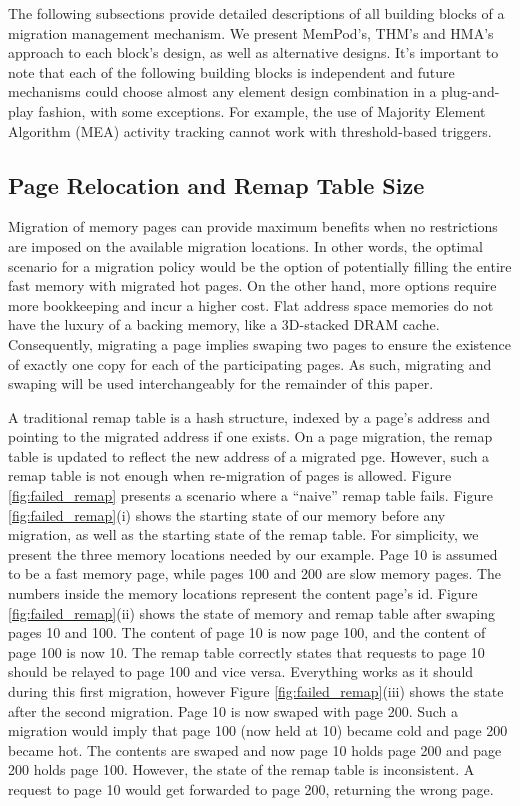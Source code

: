 The following subsections provide detailed descriptions of all building blocks of a migration management mechanism. We present MemPod's, THM's and HMA's approach to each block's design, as well as alternative designs. It's important to note that each of the following building blocks is independent and future mechanisms could choose almost any element design combination in a plug-and-play fashion, with some exceptions. For example, the use of Majority Element Algorithm (MEA) activity tracking cannot work with threshold-based triggers.

\subsection{Page Relocation and Remap Table Size}
\label{sec:relocation}

Migration of memory pages can provide maximum benefits when no restrictions are imposed on the available migration locations. In other words, the optimal scenario for a migration policy would be the option of potentially filling the entire fast memory with migrated hot pages. On the other hand, more options require more bookkeeping and incur a higher cost. Flat address space memories do not have the luxury of a backing memory, like a 3D-stacked DRAM cache. Consequently, migrating a page implies swaping two pages to ensure the existence of exactly one copy for each of the participating pages. As such, migrating and swaping will be used interchangeably for the remainder of this paper.

A traditional remap table is a hash structure, indexed by a page's address and pointing to the migrated address if one exists. On a page migration, the remap table is updated to reflect the new address of a migrated pge. However, such a remap table is not enough when re-migration of pages is allowed. Figure \ref{fig:failed_remap} presents a scenario where a ``naive'' remap table fails. Figure \ref{fig:failed_remap}(i) shows the starting state of our memory before any migration, as well as the starting state of the remap table. For simplicity, we present the three memory locations needed by our example. Page 10 is assumed to be a fast memory page, while pages 100 and 200 are slow memory pages. The numbers inside the memory locations represent the content page's id. Figure \ref{fig:failed_remap}(ii) shows the state of memory and remap table after swaping pages 10 and 100. The content of page 10 is now page 100, and the content of page 100 is now 10. The remap table correctly states that requests to page 10 should be relayed to page 100 and vice versa.  Everything works as it should during this first migration, however Figure \ref{fig:failed_remap}(iii) shows the state after the second migration. Page 10 is now swaped with page 200. Such a migration would imply that page 100 (now held at 10) became cold and page 200 became hot. The contents are swaped and now page 10 holds page 200 and page 200 holds page 100. However, the state of the remap table is inconsistent. A request to page 10 would get forwarded to page 200, returning the wrong page.

